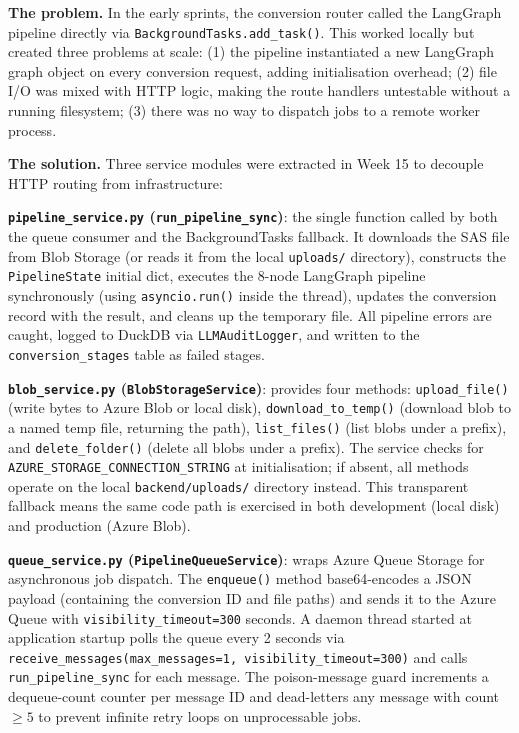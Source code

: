 \textbf{The problem.} In the early sprints, the conversion router called the
LangGraph pipeline directly via \texttt{BackgroundTasks.add\_task()}. This
worked locally but created three problems at scale: (1) the pipeline
instantiated a new LangGraph graph object on every conversion request, adding
initialisation overhead; (2) file I/O was mixed with HTTP logic, making the
route handlers untestable without a running filesystem; (3) there was no way
to dispatch jobs to a remote worker process.

\textbf{The solution.} Three service modules were extracted in Week 15 to
decouple HTTP routing from infrastructure:

\textbf{\texttt{pipeline\_service.py} (\texttt{run\_pipeline\_sync})}: the
single function called by both the queue consumer and the BackgroundTasks
fallback. It downloads the SAS file from Blob Storage (or reads it from the
local \texttt{uploads/} directory), constructs the \texttt{PipelineState}
initial dict, executes the 8-node LangGraph pipeline synchronously (using
\texttt{asyncio.run()} inside the thread), updates the conversion record with
the result, and cleans up the temporary file. All pipeline errors are caught,
logged to DuckDB via \texttt{LLMAuditLogger}, and written to the
\texttt{conversion\_stages} table as failed stages.

\textbf{\texttt{blob\_service.py} (\texttt{BlobStorageService})}: provides
four methods: \texttt{upload\_file()} (write bytes to Azure Blob or local disk),
\texttt{download\_to\_temp()} (download blob to a named temp file, returning
the path), \texttt{list\_files()} (list blobs under a prefix), and
\texttt{delete\_folder()} (delete all blobs under a prefix). The service checks
for \texttt{AZURE\_STORAGE\_CONNECTION\_STRING} at initialisation; if absent,
all methods operate on the local \texttt{backend/uploads/} directory instead.
This transparent fallback means the same code path is exercised in both
development (local disk) and production (Azure Blob).

\textbf{\texttt{queue\_service.py} (\texttt{PipelineQueueService})}: wraps
Azure Queue Storage for asynchronous job dispatch. The \texttt{enqueue()} method
base64-encodes a JSON payload (containing the conversion ID and file paths) and
sends it to the Azure Queue with \texttt{visibility\_timeout=300} seconds. A
daemon thread started at application startup polls the queue every 2 seconds
via \texttt{receive\_messages(max\_messages=1, visibility\_timeout=300)} and
calls \texttt{run\_pipeline\_sync} for each message. The poison-message guard
increments a dequeue-count counter per message ID and dead-letters any message
with count $\geq 5$ to prevent infinite retry loops on unprocessable jobs.

